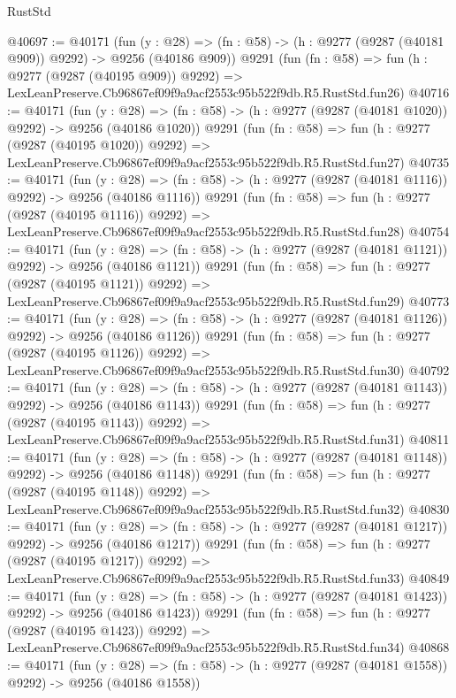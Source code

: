 \begin{lexlean}{RustStd}
\begin{coremodule}
@40697 := @40171
    (fun (y : @28) => (fn : @58) -> (h : @9277 (@9287 (@40181 @909)) @9292) -> @9256 (@40186 @909))
    @9291
    (fun (fn : @58) =>
    fun (h : @9277 (@9287 (@40195 @909)) @9292) =>
    LexLeanPreserve.Cb96867ef09f9a9acf2553c95b522f9db.R5.RustStd.fun26)
@40716 := @40171
    (fun (y : @28) =>
    (fn : @58) -> (h : @9277 (@9287 (@40181 @1020)) @9292) -> @9256 (@40186 @1020))
    @9291
    (fun (fn : @58) =>
    fun (h : @9277 (@9287 (@40195 @1020)) @9292) =>
    LexLeanPreserve.Cb96867ef09f9a9acf2553c95b522f9db.R5.RustStd.fun27)
@40735 := @40171
    (fun (y : @28) =>
    (fn : @58) -> (h : @9277 (@9287 (@40181 @1116)) @9292) -> @9256 (@40186 @1116))
    @9291
    (fun (fn : @58) =>
    fun (h : @9277 (@9287 (@40195 @1116)) @9292) =>
    LexLeanPreserve.Cb96867ef09f9a9acf2553c95b522f9db.R5.RustStd.fun28)
@40754 := @40171
    (fun (y : @28) =>
    (fn : @58) -> (h : @9277 (@9287 (@40181 @1121)) @9292) -> @9256 (@40186 @1121))
    @9291
    (fun (fn : @58) =>
    fun (h : @9277 (@9287 (@40195 @1121)) @9292) =>
    LexLeanPreserve.Cb96867ef09f9a9acf2553c95b522f9db.R5.RustStd.fun29)
@40773 := @40171
    (fun (y : @28) =>
    (fn : @58) -> (h : @9277 (@9287 (@40181 @1126)) @9292) -> @9256 (@40186 @1126))
    @9291
    (fun (fn : @58) =>
    fun (h : @9277 (@9287 (@40195 @1126)) @9292) =>
    LexLeanPreserve.Cb96867ef09f9a9acf2553c95b522f9db.R5.RustStd.fun30)
@40792 := @40171
    (fun (y : @28) =>
    (fn : @58) -> (h : @9277 (@9287 (@40181 @1143)) @9292) -> @9256 (@40186 @1143))
    @9291
    (fun (fn : @58) =>
    fun (h : @9277 (@9287 (@40195 @1143)) @9292) =>
    LexLeanPreserve.Cb96867ef09f9a9acf2553c95b522f9db.R5.RustStd.fun31)
@40811 := @40171
    (fun (y : @28) =>
    (fn : @58) -> (h : @9277 (@9287 (@40181 @1148)) @9292) -> @9256 (@40186 @1148))
    @9291
    (fun (fn : @58) =>
    fun (h : @9277 (@9287 (@40195 @1148)) @9292) =>
    LexLeanPreserve.Cb96867ef09f9a9acf2553c95b522f9db.R5.RustStd.fun32)
@40830 := @40171
    (fun (y : @28) =>
    (fn : @58) -> (h : @9277 (@9287 (@40181 @1217)) @9292) -> @9256 (@40186 @1217))
    @9291
    (fun (fn : @58) =>
    fun (h : @9277 (@9287 (@40195 @1217)) @9292) =>
    LexLeanPreserve.Cb96867ef09f9a9acf2553c95b522f9db.R5.RustStd.fun33)
@40849 := @40171
    (fun (y : @28) =>
    (fn : @58) -> (h : @9277 (@9287 (@40181 @1423)) @9292) -> @9256 (@40186 @1423))
    @9291
    (fun (fn : @58) =>
    fun (h : @9277 (@9287 (@40195 @1423)) @9292) =>
    LexLeanPreserve.Cb96867ef09f9a9acf2553c95b522f9db.R5.RustStd.fun34)
@40868 := @40171
    (fun (y : @28) =>
    (fn : @58) -> (h : @9277 (@9287 (@40181 @1558)) @9292) -> @9256 (@40186 @1558))

\end{coremodule}
\end{lexlean}
